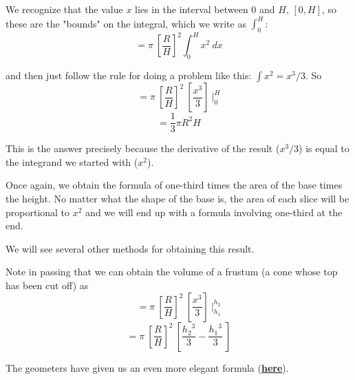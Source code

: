 \documentclass[11pt, oneside]{article}
\begin{document}
We recognize that the value $x$ lies in the interval between $0$ and $H$, $[0,H]$, so these are the "bounds" on the integral, which we write as $\int_0^H$:
\[ = \pi \ [ \frac{R}{H} ]^2 \int_0^H x^2 \ dx \]

and then just follow the rule for doing a problem like this:  $\int x^2 = x^3/3$.  So
\[ = \pi \ [ \frac{R}{H} ]^2 \ [  \frac{x^3}{3} ] \ \bigg |_0^H \]
\[ = \frac{1}{3} \pi R^2 H \]

This is the answer precisely because the derivative of the result ($x^3/3$) is equal to the integrand we started with ($x^2$).

Once again, we obtain the formula of one-third times the area of the base times the height.  No matter what the shape of the base is, the area of each slice will be proportional to $x^2$ and we will end up with a formula involving one-third at the end.

We will see several other methods for obtaining this result.

Note in passing that we can obtain the volume of a frustum (a cone whose top has been cut off) as
\[ = \pi \ [ \frac{R}{H} ]^2 \ [  \frac{x^3}{3} ] \ \bigg |_{h_1}^{h_2} \]
\[ = \pi \ [ \frac{R}{H} ]^2 \ [  \frac{{h_2}^3}{3} -  \frac{{h_1}^3}{3}  \ ] \]

The geometers have given us an even more elegant formula (\hyperref[sec:Frustum]{\textbf{here}}).
\end{document}
